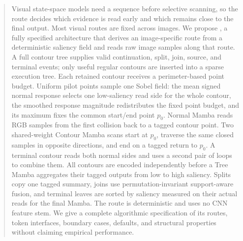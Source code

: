 \begin{abstract}
Visual state-space models need a sequence before selective scanning, so the route decides which evidence is read early and which remains close to the final output. Most visual routes are fixed across images. We propose \method, a fully specified architecture that derives an image-specific route from a deterministic saliency field and reads raw image samples along that route. A full contour tree supplies valid continuation, split, join, source, and terminal events; only useful regular contours are inserted into a sparse execution tree. Each retained contour receives a perimeter-based point budget. Uniform pilot points sample one Sobel field: the mean signed normal response selects one low-saliency read side for the whole contour, the smoothed response magnitude redistributes the fixed point budget, and its maximum fixes the common start/end point $p_0$. Normal Mamba reads RGB samples from the first collision back to a tagged contour point. Two shared-weight Contour Mamba scans start at $p_0$, traverse the same closed samples in opposite directions, and end on a tagged return to $p_0$. A terminal contour reads both normal sides and uses a second pair of loops to combine them. All contours are encoded independently before a Tree Mamba aggregates their tagged outputs from low to high saliency. Splits copy one tagged summary, joins use permutation-invariant support-aware fusion, and terminal leaves are sorted by saliency measured on their actual reads for the final Mamba. The route is deterministic and uses no CNN feature stem. We give a complete algorithmic specification of its routes, token interfaces, boundary cases, defaults, and structural properties without claiming empirical performance.
\end{abstract}
